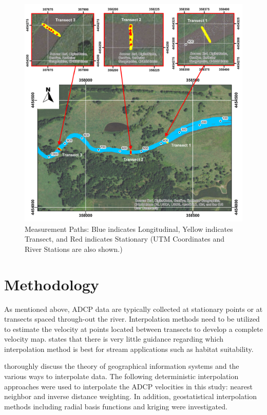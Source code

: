 \documentclass[Journal,letterpaper,BackFigs]{ascelike-new}
\begin{document}
\begin{figure}
\centering
\includegraphics[width=\textwidth]{MeasurementPaths.pdf}
\caption{Measurement Paths: Blue indicates Longitudinal, Yellow indicates Transect, and Red indicates Stationary (UTM Coordinates and River Stations are also shown.)}
\label{fig:MeasurementPaths}
\end{figure}

\section{Methodology}
As mentioned above, ADCP data are typically collected at stationary points or at transects spaced through-out the river. Interpolation methods need to be utilized to estimate the velocity at points located between transects to develop a complete velocity map.  states that there is very little guidance regarding which interpolation method is best for stream applications such as habitat suitability.

 thoroughly discuss the theory of geographical information systems and the various ways to interpolate data. The following deterministic interpolation approaches were used to interpolate the ADCP velocities in this study: nearest neighbor and inverse distance weighting. In addition, geostatistical interpolation methods including radial basis functions and kriging were investigated.
\end{document}
